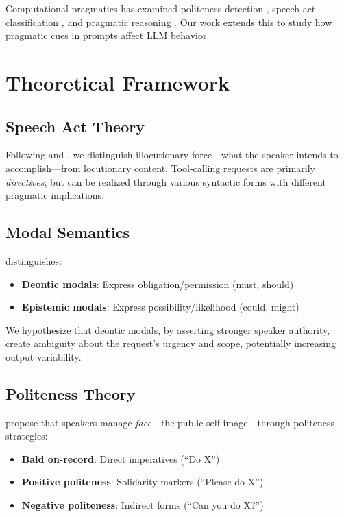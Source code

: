 \documentclass[11pt]{article}
\begin{document}
Computational pragmatics has examined politeness detection \cite{danescu2013computational}, speech act classification \cite{zhang2017speech}, and pragmatic reasoning \cite{fried2023pragmatics}. Our work extends this to study how pragmatic cues in prompts affect LLM behavior.

\section{Theoretical Framework}

\subsection{Speech Act Theory}

Following \citet{austin1962things} and \citet{searle1969speech}, we distinguish illocutionary force---what the speaker intends to accomplish---from locutionary content. Tool-calling requests are primarily \textit{directives}, but can be realized through various syntactic forms with different pragmatic implications.

\subsection{Modal Semantics}

\citet{kratzer1991modality} distinguishes:
\begin{itemize}
    \item \textbf{Deontic modals}: Express obligation/permission (must, should)
    \item \textbf{Epistemic modals}: Express possibility/likelihood (could, might)
\end{itemize}

We hypothesize that deontic modals, by asserting stronger speaker authority, create ambiguity about the request's urgency and scope, potentially increasing output variability.

\subsection{Politeness Theory}

\citet{brown1987politeness} propose that speakers manage \textit{face}---the public self-image---through politeness strategies:
\begin{itemize}
    \item \textbf{Bald on-record}: Direct imperatives (``Do X'')
    \item \textbf{Positive politeness}: Solidarity markers (``Please do X'')
    \item \textbf{Negative politeness}: Indirect forms (``Can you do X?'')
\end{itemize}
\end{document}
